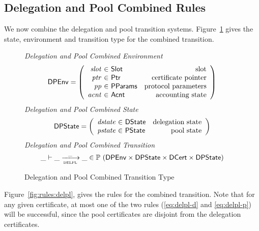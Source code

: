 \clearpage

\subsection{Delegation and Pool Combined Rules}
\label{sec:del-pool-rules}

We now combine the delegation and pool transition systems.
Figure~\ref{fig:defs:delpl} gives the state, environment and transition type for the
combined transition.

\begin{figure}[hbt]
  \emph{Delegation and Pool Combined Environment}
  \begin{equation*}
    \DPEnv =
    \left(
      \begin{array}{r@{~\in~}lr}
        \var{slot} & \Slot & \text{slot}\\
        \var{ptr} & \Ptr & \text{certificate pointer}\\
        \var{pp} & \PParams & \text{protocol parameters}\\
        \var{acnt} & \Acnt & \text{accounting state}
      \end{array}
    \right)
  \end{equation*}
  \emph{Delegation and Pool Combined State}
  \begin{equation*}
    \DPState =
    \left(
      \begin{array}{r@{~\in~}lr}
        \var{dstate} & \DState & \text{delegation state}\\
        \var{pstate} & \PState & \text{pool state}\\
      \end{array}
    \right)
  \end{equation*}
  \emph{Delegation and Pool Combined Transition}
  \begin{equation*}
    \_ \vdash \_ \trans{delpl}{\_} \_ \in
      \powerset (
        \DPEnv \times \DPState \times \DCert \times \DPState)
  \end{equation*}
  \caption{Delegation and Pool Combined Transition Type}
  \label{fig:defs:delpl}
\end{figure}

\clearpage

Figure~\ref{fig:rules:delpl}, gives the rules for the combined transition.
Note that for any given certificate, at most one of the two rules
(\cref{eq:delpl-d} and \cref{eq:delpl-p})
will be successful, since the pool certificates are disjoint from the delegation certificates.

